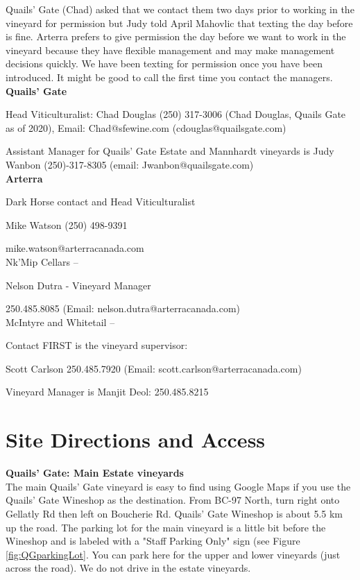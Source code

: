 \documentclass[11pt,letter]{article}
\begin{document}
Quails' Gate (Chad) asked that we contact them two days prior to working in the vineyard for permission but Judy told April Mahovlic that texting the day before is fine. Arterra prefers to give permission the day before we want to work in the vineyard because they have flexible management and may make management decisions quickly. We have been texting for permission once you have been introduced. It might be good to call the first time you contact the managers. \\


{\bf Quails' Gate}

Head Viticulturalist: Chad Douglas (250) 317-3006 (Chad Douglas, Quails Gate as of 2020), Email: Chad@sfewine.com (cdouglas@quailsgate.com)

Assistant Manager for Quails' Gate Estate and Mannhardt vineyards is Judy Wanbon (250)-317-8305 (email: Jwanbon@quailsgate.com) \\

{\bf Arterra}

Dark Horse contact and Head Viticulturalist %

Mike Watson (250) 498-9391

mike.watson@arterracanada.com\\

Nk'Mip Cellars --

Nelson Dutra - Vineyard Manager

250.485.8085 (Email: nelson.dutra@arterracanada.com) \\

McIntyre and Whitetail -- 

Contact FIRST is the vineyard supervisor:

Scott Carlson 250.485.7920 (Email: scott.carlson@arterracanada.com)

Vineyard Manager is Manjit Deol: 250.485.8215


\section{Site Directions and Access}

{\bf Quails' Gate: Main Estate vineyards} \\
The main Quails' Gate vineyard is easy to find using Google Maps if you use the Quails' Gate Wineshop as the destination. 
From BC-97 North, turn right onto Gellatly Rd then left on Boucherie Rd. Quails' Gate Wineshop is about 5.5 km up the road. The parking lot for the main vineyard is a little bit before the Wineshop and is labeled with a "Staff Parking Only" sign (see Figure \ref{fig:QGparkingLot}. You can park here for the upper and lower vineyards (just across the road). We do not drive in the estate vineyards.
\end{document}
